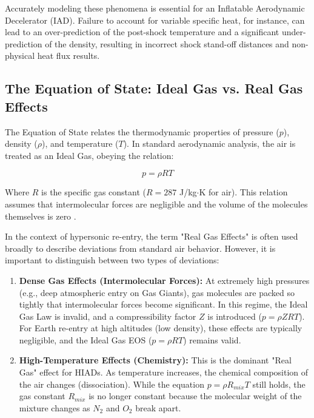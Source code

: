 Accurately modeling these phenomena is essential for an Inflatable Aerodynamic Decelerator (IAD). Failure to account for variable specific heat, for instance, can lead to an over-prediction of the post-shock temperature and a significant under-prediction of the density, resulting in incorrect shock stand-off distances and non-physical heat flux results.


\subsection{The Equation of State: Ideal Gas vs. Real Gas Effects}

\par
The Equation of State relates the thermodynamic properties of pressure ($p$), density ($\rho$), and temperature ($T$). In standard aerodynamic analysis, the air is treated as an Ideal Gas, obeying the relation:

\begin{equation}
    p = \rho R T
\end{equation}

Where $R$ is the specific gas constant ($R = 287$ J/kg$\cdot$K for air). This relation assumes that intermolecular forces are negligible and the volume of the molecules themselves is zero \cite{AndersonHypersonic}.



In the context of hypersonic re-entry, the term "Real Gas Effects" is often used broadly to describe deviations from standard air behavior. However, it is important to distinguish between two types of deviations:

\begin{enumerate}
    \item \textbf{Dense Gas Effects (Intermolecular Forces):} At extremely high pressures (e.g., deep atmospheric entry on Gas Giants), gas molecules are packed so tightly that intermolecular forces become significant. In this regime, the Ideal Gas Law is invalid, and a compressibility factor $Z$ is introduced ($p = \rho Z R T$). For Earth re-entry at high altitudes (low density), these effects are typically negligible, and the Ideal Gas EOS ($p = \rho R T$) remains valid.
    
    \item \textbf{High-Temperature Effects (Chemistry):} This is the dominant "Real Gas" effect for HIADs. As temperature increases, the chemical composition of the air changes (dissociation). While the equation $p = \rho R_{mix} T$ still holds, the gas constant $R_{mix}$ is no longer constant because the molecular weight of the mixture changes as $N_2$ and $O_2$ break apart.
\end{enumerate}

